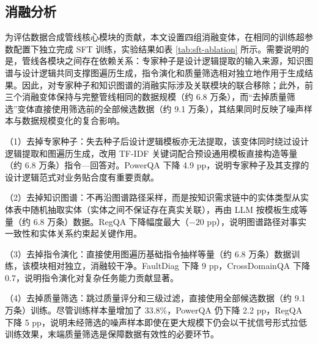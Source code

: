 \documentclass[fontset=fandol,type=master,campus=shenzhen,etitleauto=true]{hithesisbook}
\begin{document}
\subsection{消融分析}\label{ux6d88ux878dux5206ux6790}

为评估数据合成管线核心模块的贡献，本文设置四组消融变体，在相同的训练超参数配置下独立完成 SFT 训练，实验结果如表 \ref{tab:sft-ablation} 所示。需要说明的是，管线各模块之间存在依赖关系：专家种子是设计逻辑提取的输入来源，知识图谱与设计逻辑共同支撑图遍历生成，指令演化和质量筛选相对独立地作用于生成结果。因此，对专家种子和知识图谱的消融实际涉及关联模块的联合移除；此外，前三个消融变体保持与完整管线相同的数据规模（约 6.8 万条），而``去掉质量筛选''变体直接使用筛选前的全部候选数据（约 9.1 万条），其结果同时反映了噪声样本与数据规模变化的复合影响。

（1）去掉专家种子：失去种子后设计逻辑模板亦无法提取，该变体同时绕过设计逻辑提取和图遍历生成，改用 TF-IDF 关键词配合预设通用模板直接构造等量（约 6.8 万条）指令---回答对。PowerQA 下降 4.9 pp，说明专家种子及其支撑的设计逻辑范式对业务贴合度有重要贡献。

（2）去掉知识图谱：不再沿图谱路径采样，而是按知识需求链中的实体类型从实体表中随机抽取实体（实体之间不保证存在真实关联），再由 LLM 按模板生成等量（约 6.8 万条）数据。RegQA 下降幅度最大（$-20$ pp），说明图谱路径对事实一致性和实体关系约束起关键作用。

（3）去掉指令演化：直接使用图遍历基础指令抽样等量（约 6.8 万条）数据训练，该模块相对独立，消融较干净。FaultDiag 下降 9 pp，CrossDomainQA 下降 0.7，说明指令演化对复杂任务能力贡献显著。

（4）去掉质量筛选：跳过质量评分和三级过滤，直接使用全部候选数据（约 9.1 万条）训练。尽管训练样本量增加了 33.8\%，PowerQA 仍下降 2.2 pp，RegQA 下降 5 pp，说明未经筛选的噪声样本即使在更大规模下仍会以干扰信号形式拉低训练效果，末端质量筛选是保障数据有效性的必要环节。

\begin{table}[htbp]
\centering
\caption{SFT数据合成管线消融实验结果}
\label{tab:sft-ablation}
\small
{}
\end{table}
\end{document}
